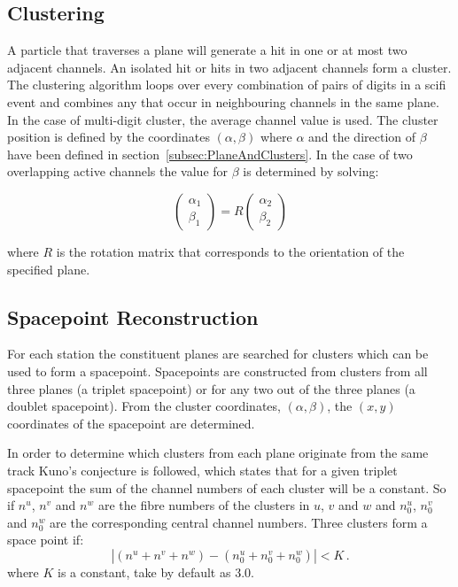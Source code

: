   \subsection{Clustering}
  \label{subsec:Clustering}
  A particle that traverses a plane will generate a hit in one or at most two adjacent channels.  An isolated hit or hits in two adjacent channels form a cluster. The clustering algorithm loops over every combination of pairs of digits in a scifi event and combines any that occur in neighbouring channels in the same plane. In the case of multi-digit cluster, the average channel value is used. The cluster position is defined by the coordinates $(\alpha, \beta)$ where $\alpha$ and the direction of $\beta$ have been defined in section~\ref{subsec:PlaneAndClusters}. In the case of two overlapping active channels the value for $\beta$ is determined by solving:
  
  \begin{equation}
    \begin{pmatrix}
     \alpha_1 \\ \beta_1
    \end{pmatrix} = R
    \begin{pmatrix}
      \alpha_2 \\ \beta_2
    \end{pmatrix}
  \end{equation}
  
  \noindent
  where $R$ is the rotation matrix that corresponds to the orientation of the specified plane. 

  \subsection{Spacepoint Reconstruction}
  \label{subsec:SpacepointReconstruction}
  For each station the constituent planes are searched for clusters which can be used to form a spacepoint. Spacepoints are constructed from clusters from all three planes (a triplet spacepoint) or for any two out of the three planes (a doublet spacepoint). From the cluster coordinates, $(\alpha, \beta)$, the $(x, y)$ coordinates of the spacepoint are determined.

  In order to determine which clusters from each plane originate from the same track Kuno's conjecture\cite{MiceTrackers} is followed, which states that for a given triplet spacepoint the sum of the channel numbers of each cluster will be a constant.  So if $n^u$, $n^v$ and $n^w$ are the fibre numbers of the clusters in $u$, $v$ and $w$ and $n^u_0$, $n^v_0$ and $n^w_0$ are the corresponding central channel numbers. Three clusters form a space point if:
  \begin{equation}
    | (n^u + n^v + n^w) - (n^u_0 + n^v_0 + n^w_0) | < K \, .
  \end{equation}
  where $K$ is a constant, take by default as 3.0.
  
